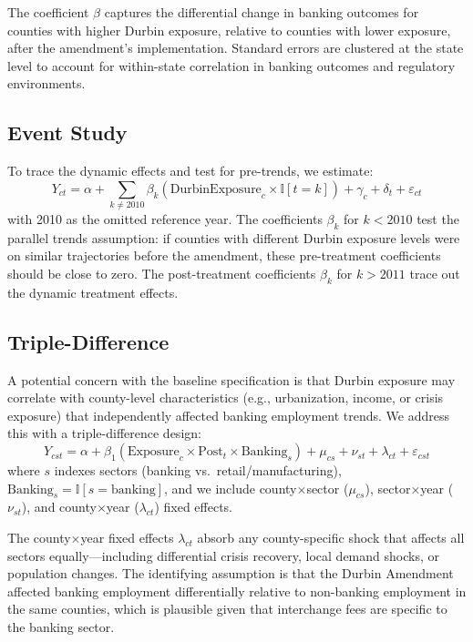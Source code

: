 \documentclass[12pt]{article}
\newcommand{\ind}{\mathbb{I}}
\begin{document}
The coefficient $\beta$ captures the differential change in banking outcomes for counties with higher Durbin exposure, relative to counties with lower exposure, after the amendment's implementation. Standard errors are clustered at the state level to account for within-state correlation in banking outcomes and regulatory environments.

\subsection{Event Study}

To trace the dynamic effects and test for pre-trends, we estimate:
\begin{equation}\label{eq:event}
Y_{ct} = \alpha + \sum_{k \neq 2010} \beta_k (\text{DurbinExposure}_c \times \ind[t = k]) + \gamma_c + \delta_t + \varepsilon_{ct}
\end{equation}
with 2010 as the omitted reference year. The coefficients $\beta_k$ for $k < 2010$ test the parallel trends assumption: if counties with different Durbin exposure levels were on similar trajectories before the amendment, these pre-treatment coefficients should be close to zero. The post-treatment coefficients $\beta_k$ for $k > 2011$ trace out the dynamic treatment effects.

\subsection{Triple-Difference}

A potential concern with the baseline specification is that Durbin exposure may correlate with county-level characteristics (e.g., urbanization, income, or crisis exposure) that independently affected banking employment trends. We address this with a triple-difference design:
\begin{equation}\label{eq:ddd}
Y_{cst} = \alpha + \beta_1 (\text{Exposure}_c \times \text{Post}_t \times \text{Banking}_s) + \mu_{cs} + \nu_{st} + \lambda_{ct} + \varepsilon_{cst}
\end{equation}
where $s$ indexes sectors (banking vs.\ retail/manufacturing), $\text{Banking}_s = \ind[s = \text{banking}]$, and we include county$\times$sector ($\mu_{cs}$), sector$\times$year ($\nu_{st}$), and county$\times$year ($\lambda_{ct}$) fixed effects.

The county$\times$year fixed effects $\lambda_{ct}$ absorb any county-specific shock that affects all sectors equally---including differential crisis recovery, local demand shocks, or population changes. The identifying assumption is that the Durbin Amendment affected banking employment differentially relative to non-banking employment in the same counties, which is plausible given that interchange fees are specific to the banking sector.
\end{document}
